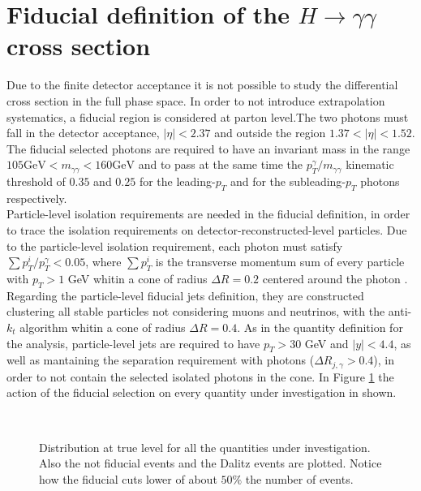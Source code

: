 \section{Fiducial definition of the $H \rightarrow \gamma\gamma$ cross section}
Due to the finite detector acceptance it is not possible to study the differential cross section in the full phase space. In order to not introduce extrapolation systematics, a fiducial region is considered at parton level.The two photons must fall in the detector acceptance, $|\eta| < 2.37$ and outside the region $1.37 < |\eta| < 1.52$. The fiducial selected photons are required to have an invariant mass in the range $105 \text{GeV} < m_{\gamma\gamma} < 160 \text{GeV}$ and to pass at the same time the $p_T^{\gamma}/m_{\gamma\gamma}$ kinematic threshold of $0.35$ and $0.25$ for the leading-$p_T$ and for the subleading-$p_T$ photons respectively.
\\
Particle-level isolation requirements are needed in the fiducial definition, in order to trace the isolation requirements on detector-reconstructed-level particles. Due to the particle-level isolation requirement, each photon must satisfy $\sum p_T^i / p_T^{\gamma} < 0.05$, where $\sum p_T^i$ is the transverse momentum sum of every particle with $p_T > 1$ GeV whitin a cone of radius $\Delta R = 0.2$ centered around the photon .
\\
Regarding the particle-level fiducial jets definition, they are constructed clustering all stable particles not considering muons and neutrinos, with the anti-$k_t$ algorithm whitin a cone of radius $\Delta R = 0.4$. As in the quantity definition for the analysis, particle-level jets are required to have $p_T > 30$ GeV and $|y| < 4.4$, as well as mantaining the separation requirement with photons ($\Delta R_{j,\gamma} > 0.4$), in order to not contain the selected isolated photons in the cone. In Figure \ref{fiducial} the action of the fiducial selection on every quantity under investigation in shown.
\begin{figure}[htb]
\centering
{}
\end{figure}
\begin{figure}[ht]
\centering
{}
 \\
\caption{Distribution at true level for all the quantities under investigation. Also the not fiducial events and the Dalitz events are plotted. Notice how the fiducial cuts lower of about $50\%$ the number of events.}
\label{fiducial}
\end{figure}

